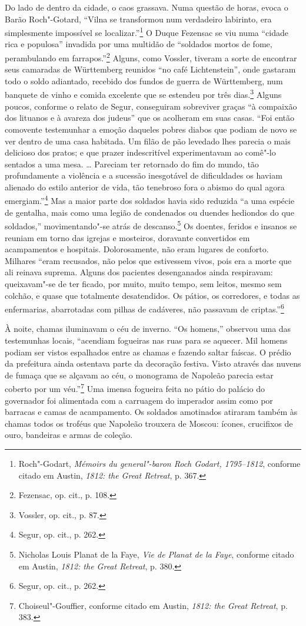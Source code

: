 Do lado de dentro da cidade, o caos grassava. Numa questão de horas,
evoca o Barão Roch"-Gotard, ``Vilna se transformou num verdadeiro
labirinto, era simplesmente impossível se localizar.''\footnote{Roch"-Godart,
  \emph{Mémoirs du general"-baron Roch Godart, 1795--1812}, conforme
  citado em Austin, \emph{1812: the Great Retreat}, p. 367.} O Duque
Fezensac se viu numa ``cidade rica e populosa'' invadida por uma
multidão de ``soldados mortos de fome, perambulando em
farrapos.''\footnote{Fezensac, op. cit., p. 108.} Alguns, como Vossler,
tiveram a sorte de encontrar seus camaradas de Württemberg reunidos ``no
café Lichtenstein'', onde gastaram todo o soldo adiantado, recebido dos
fundos de guerra de Württemberg, num banquete de vinho e comida
excelente que se estendeu por três dias.\footnote{Vossler, op. cit., p.
  87.} Alguns poucos, conforme o relato de Segur, conseguiram sobreviver
graças ``à compaixão dos lituanos e à avareza dos judeus'' que os
acolheram em suas casas. ``Foi então comovente testemunhar a emoção
daqueles pobres diabos que podiam de novo se ver dentro de uma casa
habitada. Um filão de pão levedado lhes parecia o mais delicioso dos
pratos; e que prazer indescritível experimentavam ao comê"-lo sentados a
uma mesa. \ldots{} Pareciam ter retornado do fim do mundo, tão
profundamente a violência e a sucessão inesgotável de dificuldades os
haviam alienado do estilo anterior de vida, tão tenebroso fora o abismo
do qual agora emergiam.''\footnote{Segur, op. cit., p. 262.} Mas a maior
parte dos soldados havia sido reduzida ``a uma espécie de gentalha, mais
como uma legião de condenados ou duendes hediondos do que soldados,''
movimentando"-se atrás de descanso.\footnote{Nicholas Louis Planat de la
  Faye, \emph{Vie de Planat de la Faye}, conforme citado em Austin,
  \emph{1812: the Great Retreat}, p. 380.} Os doentes, feridos e insanos
se reuniam em torno das igrejas e mosteiros, doravante convertidos em
acampamentos e hospitais. Dolorosamente, não eram lugares de conforto.
Milhares ``eram recusados, não pelos que estivessem vivos, pois era a
morte que ali reinava suprema. Alguns dos pacientes desenganados ainda
respiravam: queixavam"-se de ter ficado, por muito, muito tempo, sem
leitos, mesmo sem colchão, e quase que totalmente desatendidos. Os
pátios, os corredores, e todas as enfermarias, abarrotadas com pilhas de
cadáveres, não passavam de criptas.''\footnote{Segur, op. cit., p. 262.}

À noite, chamas iluminavam o céu de inverno. ``Os homens,'' observou uma
das testemunhas locais, ``acendiam fogueiras nas ruas para se aquecer.
Mil homens podiam ser vistos espalhados entre as chamas e fazendo saltar
faíscas. O prédio da prefeitura ainda ostentava parte da decoração
festiva. Visto através das nuvens de fumaça que se alçavam ao céu, o
monograma de Napoleão parecia estar coberto por um véu.''\footnote{Choiseul"-Gouffier,
  conforme citado em Austin, \emph{1812: the Great Retreat}, p. 383.}
Uma imensa fogueira feita no pátio do palácio do governador foi
alimentada com a carruagem do imperador assim como por barracas e camas
de acampamento. Os soldados amotinados atiraram também às chamas todos
os troféus que Napoleão trouxera de Moscou: ícones, crucifixos de ouro,
bandeiras e armas de coleção.

